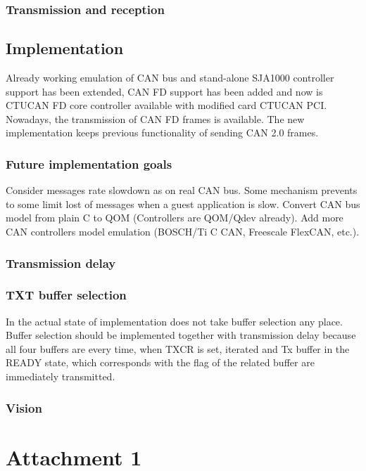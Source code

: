 \documentclass{ctuthesis}
\begin{document}
 \subsection{Transmission and reception}

 \section{Implementation}
  Already working emulation of CAN bus and stand-alone SJA1000 controller support has been extended, CAN FD support has been added and now is CTUCAN FD core controller available with modified card CTUCAN PCI. Nowadays, the transmission of CAN FD frames is available. The new implementation keeps previous functionality of sending CAN 2.0 frames.

 \subsection{Future implementation goals}
  Consider messages rate slowdown as on real CAN bus. Some mechanism prevents to some limit lost of messages when a guest application is slow. Convert CAN bus model from plain C to QOM (Controllers are QOM/Qdev already). Add more CAN controllers model emulation (BOSCH/Ti C CAN, Freescale FlexCAN, etc.).
 
 \subsection{Transmission delay}
 
 \subsection{TXT buffer selection}
  In the actual state of implementation does not take buffer selection any place. Buffer selection should be implemented together with transmission delay because all four buffers are every time, when TXCR is set, iterated and Tx buffer in the READY state, which corresponds with the flag of the related buffer are immediately transmitted.
 
 \subsection{Vision}

\chapter{Attachment 1}
 
\end{document}
